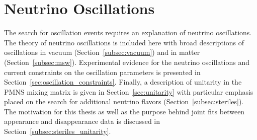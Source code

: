 \graphicspath{{chapters/oscillations/images/}}
\chapter{Neutrino Oscillations}
The search for oscillation events requires an explanation of neutrino oscillations.
The theory of neutrino oscillations is included here with broad descriptions of oscillations in vacuum (Section~\ref{subsec:vacuum}) and in matter (Section~\ref{subsec:msw}). 
Experimental evidence for the neutrino oscillations and current constraints on the oscillation parameters is presented in Section~\ref{sec:oscillation_constraints}.
Finally, a description of unitarity in the PMNS mixing matrix is given in Section~\ref{sec:unitarity} with particular emphasis placed on the search for additional neutrino flavors (Section~\ref{subsec:steriles}).
The motivation for this thesis as well as the purpose behind joint fits between appearance and disappearance data is discussed in Section~\ref{subsec:steriles_unitarity}.

\label{sec:oscillation_theory}


\label{sec:oscillation_constraints}


\label{sec:unitarity}

